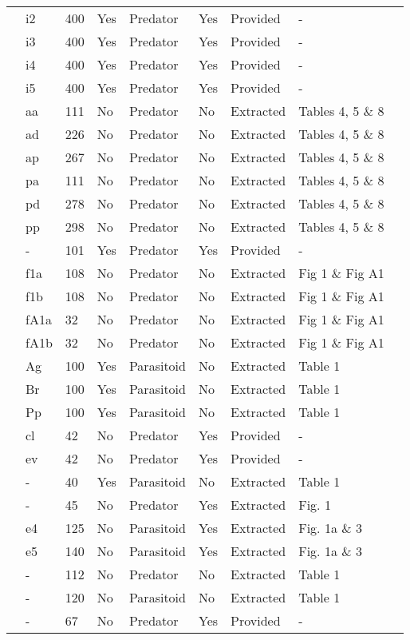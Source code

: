 \begin{longtable}{lllllllll}
\citet{Elliott:2005aa}&i2&400&Yes&Predator&Yes&Provided&-&\tabularnewline
\citet{Elliott:2005aa}&i3&400&Yes&Predator&Yes&Provided&-&\tabularnewline
\citet{Elliott:2005aa}&i4&400&Yes&Predator&Yes&Provided&-&\tabularnewline
\citet{Elliott:2005aa}&i5&400&Yes&Predator&Yes&Provided&-&\tabularnewline
\citet{Eveleigh:1982aa}&aa&111&No&Predator&No&Extracted&Tables 4, 5 \& 8&\citet{Novak:2020aa}\tabularnewline
\citet{Eveleigh:1982aa}&ad&226&No&Predator&No&Extracted&Tables 4, 5 \& 8&\citet{Novak:2020aa}\tabularnewline
\citet{Eveleigh:1982aa}&ap&267&No&Predator&No&Extracted&Tables 4, 5 \& 8&\citet{Novak:2020aa}\tabularnewline
\citet{Eveleigh:1982aa}&pa&111&No&Predator&No&Extracted&Tables 4, 5 \& 8&\citet{Novak:2020aa}\tabularnewline
\citet{Eveleigh:1982aa}&pd&278&No&Predator&No&Extracted&Tables 4, 5 \& 8&\citet{Novak:2020aa}\tabularnewline
\citet{Eveleigh:1982aa}&pp&298&No&Predator&No&Extracted&Tables 4, 5 \& 8&\citet{Novak:2020aa}\tabularnewline
\citet{Fussmann:2005aa}&-&101&Yes&Predator&Yes&Provided&-&\citet{Fussmann:2020aa}\tabularnewline
\citet{Griffen:2007aa}&f1a&108&No&Predator&No&Extracted&Fig 1 \& Fig A1&\citet{Novak:2020aa}\tabularnewline
\citet{Griffen:2007aa}&f1b&108&No&Predator&No&Extracted&Fig 1 \& Fig A1&\citet{Novak:2020aa}\tabularnewline
\citet{Griffen:2007aa}&fA1a&32&No&Predator&No&Extracted&Fig 1 \& Fig A1&\citet{Novak:2020aa}\tabularnewline
\citet{Griffen:2007aa}&fA1b&32&No&Predator&No&Extracted&Fig 1 \& Fig A1&\citet{Novak:2020aa}\tabularnewline
\citet{Hassan:1976aa}&Ag&100&Yes&Parasitoid&No&Extracted&Table 1&\citet{Novak:2020aa}\tabularnewline
\citet{Hassan:1976aa}&Br&100&Yes&Parasitoid&No&Extracted&Table 1&\citet{Novak:2020aa}\tabularnewline
\citet{Hassan:1976aa}&Pp&100&Yes&Parasitoid&No&Extracted&Table 1&\citet{Novak:2020aa}\tabularnewline
\citet{Hossie:2016aa}&cl&42&No&Predator&Yes&Provided&-&\citet{Hossie:2020aa}\tabularnewline
\citet{Hossie:2016aa}&ev&42&No&Predator&Yes&Provided&-&\citet{Hossie:2020aa}\tabularnewline
\citet{Huffaker:1982aa}&-&40&Yes&Parasitoid&No&Extracted&Table 1&\citet{Novak:2020aa}\tabularnewline
\citet{Johnson:2006aa}&-&45&No&Predator&Yes&Extracted&Fig. 1&\citet{Novak:2020aa}\tabularnewline
\citet{Jones:1988aa, Jones:1986aa}&e4&125&No&Parasitoid&Yes&Extracted&Fig. 1a \& 3&\citet{Novak:2020aa}\tabularnewline
\citet{Jones:1988aa, Jones:1986aa}&e5&140&No&Parasitoid&Yes&Extracted&Fig. 1a \& 3&\citet{Novak:2020aa}\tabularnewline
\citet{Katz:1985ai}&-&112&No&Predator&No&Extracted&Table 1&\citet{Arditi:1990sp}\tabularnewline
\citet{Kfir:1983aa}&-&120&No&Parasitoid&No&Extracted&Table 1&\citet{Novak:2020aa}\tabularnewline
\citet{Kratina:2009aa}&-&67&No&Predator&Yes&Provided&-&\citet{Kratina:2020aa}\tabularnewline

\end{longtable}
